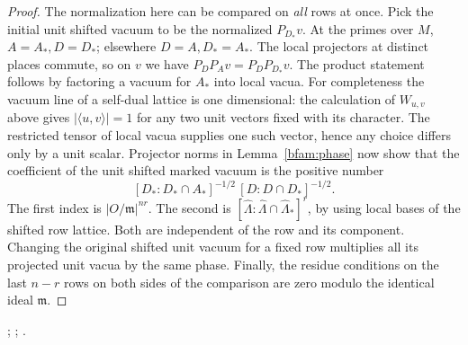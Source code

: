 \begin{proof}
The normalization here can be compared on \emph{all} rows at
once. Pick the initial unit shifted vacuum to be the normalized
\(P_{D_*}v\). At the primes over \(M\), \(A=A_*,D=D_*\);
elsewhere \(D=A,D_*=A_*\). The local projectors at distinct
places commute, so on \(v\) we have
\(P_DP_Av=P_DP_{D_*}v\).
The product statement follows by factoring a vacuum for \(A_*\)
into local vacua. For completeness the vacuum line of a self-dual
lattice is one dimensional: the calculation of \(W_{u,v}\) above
gives \(|\langle u,v\rangle|=1\) for any two unit vectors fixed
with its character. The restricted tensor of local vacua supplies
one such vector, hence any choice differs only by a unit scalar.
Projector norms in Lemma~\ref{bfam:phase} now show that the
coefficient of the unit shifted marked vacuum is the positive
number
\[
 [D_*:D_*\cap A_*]^{-1/2}\,
 [D:D\cap D_*]^{-1/2}.
\]
The first index is \(|O/\mathfrak m|^{nr}\). The second is
\([\widehat\Lambda:\widehat\Lambda\cap\widehat\Lambda_*]^r\),
by using local bases of the shifted row lattice. Both are
independent of the row and its component. Changing the original
shifted unit vacuum for a fixed row multiplies all its projected
unit vacua by the same phase. Finally, the residue conditions on
the last \(n-r\) rows on both sides of the comparison are zero
modulo the identical ideal \(\mathfrak m\).
\end{proof}
;
;
.

